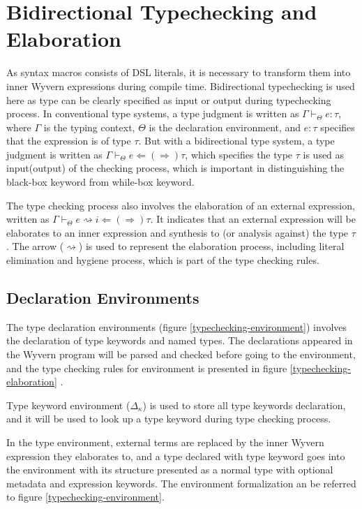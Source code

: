 \documentclass{sig-alternate}
\begin{document}
\section{Bidirectional Typechecking and Elaboration}
As syntax macros consists of DSL literals, it is necessary to transform them into inner Wyvern expressions during compile time. Bidirectional typechecking is used here as type can be clearly specified as input or output during typechecking process. In conventional type systems, a type judgment is written as $\Gamma\vdash_{\Theta} e:\tau$, where $\Gamma$ is the typing context, $\Theta$ is the declaration environment, and $e:\tau$ specifies that the expression is of type $\tau$. But with a bidirectional type system, a type judgment is written as $\Gamma\vdash_{\Theta} e\Leftarrow(\Rightarrow)\tau$, which specifies the type $\tau$ is used as input(output) of the checking process, which is important in distinguishing the black-box keyword from while-box keyword.
\par
The type checking process also involves the elaboration of an external expression, written as $\Gamma\vdash_{\Theta} e\rightsquigarrow i \Leftarrow(\Rightarrow) \tau$. It indicates that an external expression will be elaborates to an inner expression and synthesis to (or analysis against) the type $\tau$. The arrow ($\rightsquigarrow$) is used to represent the elaboration process, including literal elimination and hygiene process, which is part of the type checking rules.

\subsection{Declaration Environments}
The type declaration environments (figure \ref{typechecking-environment}) involves the declaration of type keywords and named types. The declarations appeared in the Wyvern program will be parsed and checked before going to the environment, and the type checking rules for environment is presented in figure \ref{typechecking-elaboration} . 

Type keyword environment ($\Delta_\kappa$) is used to store all type keywords declaration, and it will be used to look up a type keyword during type checking process.

In the type environment, external terms are replaced by the inner Wyvern expression they elaborates to, and a type declared with type keyword goes into the environment with its structure presented as a normal type with optional metadata and expression keywords. The environment formalization an be referred to figure \ref{typechecking-environment}.
\end{document}
